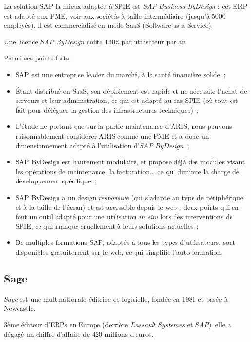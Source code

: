         La solution SAP la mieux adaptée à SPIE est \textit{SAP Business ByDesign} : cet ERP est adapté aux PME, voir aux sociétés à taille intermédiaire (jusqu'à 5000 employés). Il est commercialisé en mode SaaS (Software as a Service).

        Une licence \textit{SAP ByDesign} coûte 130€ par utilisateur par an.

        Parmi ses points forts:

        \begin{itemize}
            \item SAP est une entreprise leader du marché, à la santé financière solide~;
            \item Étant distribué en SaaS, son déploiement est rapide et ne nécessite l'achat de serveurs et leur administration, ce qui est adapté au cas SPIE (où tout est fait pour déléguer la gestion des infrastructures techniques)~;
            \item L'étude ne portant que sur la partie maintenance d'ARIS, nous pouvons raisonnablement considérer ARIS comme une PME et a donc un dimensionnement adapté à l'utilisation d'\textit{SAP ByDesign}~;
            \item SAP ByDesign est hautement modulaire, et propose déjà des modules visant les opérations de maintenance, la facturation... ce qui diminue la charge de développement spécifique~;
            \item SAP ByDesign a un design \textit{responsive} (qui s'adapte au type de périphérique et à la taille de l'écran) et est accessible depuis le web : deux points qui en font un outil adapté pour une utilisation \textit{in situ} lors des interventions de SPIE, ce qui manque cruellement à leurs solutions actuelles~;
            \item De multiples formations SAP, adaptés à tous les types d'utilisateurs, sont disponibles gratuitement sur le web, ce qui simplifie l'auto-formation.
        \end{itemize}


    \subsection{Sage}

        \textit{Sage} est une multinationale éditrice de logicielle, fondée en 1981 et basée à Newcastle.

        3ème éditeur d'ERPs en Europe (derrière \textit{Dassault Systemes} et \textit{SAP}), elle a dégagé un chiffre d'affaire de 420 millions d'euros.

